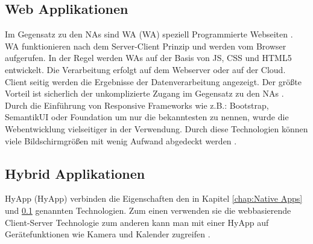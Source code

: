 \subsection{Web Applikationen}\label{chap:Webapplikationen}
Im Gegensatz zu den \acs{NA}s sind \acl{WA} (\acs{WA}) speziell Programmierte Webseiten \cite{Hochsprachen}.
\acs{WA} funktionieren nach dem Server-Client Prinzip und werden vom Browser aufgerufen. In der Regel werden \acs{WA}s auf der Basis von \acs{JS}, \acs{CSS} und \acs{HTML5} entwickelt. Die Verarbeitung erfolgt auf dem Webserver oder auf der Cloud. 
Client seitig werden die Ergebnisse der Datenverarbeitung angezeigt. Der größte Vorteil ist sicherlich der unkomplizierte Zugang im Gegensatz zu den \acs{NA}s \cite{WebApps}.
Durch die Einführung von Responsive Frameworks wie z.B.: Bootstrap, SemantikUI oder Foundation um nur die bekanntesten zu nennen, wurde die Webentwicklung vielseitiger in der Verwendung. Durch diese Technologien können viele Bildschirmgrößen mit wenig Aufwand abgedeckt werden \cite{CSS}. 

\subsection{Hybrid Applikationen}
\acl{HyApp} (\acs{HyApp}) verbinden die Eigenschaften den in Kapitel \ref{chap:Native Apps} und \ref{chap:Webapplikationen} genannten Technologien. Zum einen verwenden sie die webbasierende Client-Server Technologie zum anderen kann man mit einer \acs{HyApp} auf Gerätefunktionen wie Kamera und Kalender zugreifen \cite{HybridApps}. 

